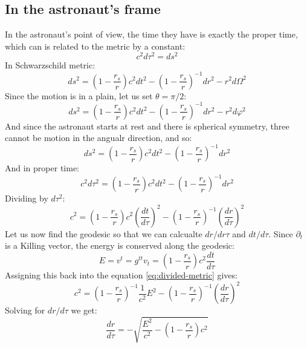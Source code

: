 \documentclass{article}
\begin{document}
\subsection{In the astronaut's frame}
In the astronaut's point of view, the time they have is exactly the proper time, which can is related to the metric by a constant:
\begin{equation}
    c^2d\tau^2 = ds^2
\end{equation}
In Schwarzschild metric:
\begin{equation}
    ds^2 = \left(1 - \frac{r_s}{r}\right)c^2dt^2 - \left(1 - \frac{r_s}{r}\right)^{-1}dr^2 - r^2d\Omega^2
\end{equation}
Since the motion is in a plain, let us set $\theta = \pi/2$:
\begin{equation}
    ds^2 = \left(1 - \frac{r_s}{r}\right)c^2dt^2 - \left(1 - \frac{r_s}{r}\right)^{-1}dr^2 - r^2d\varphi^2
\end{equation}
And since the astronaut starts at rest and there is spherical symmetry, three cannot be motion in the angualr direction, and so:
\begin{equation}
    ds^2 = \left(1 - \frac{r_s}{r}\right)c^2dt^2 - \left(1 - \frac{r_s}{r}\right)^{-1}dr^2
\end{equation}
And in proper time:
\begin{equation}
    c^2d\tau^2 = \left(1 - \frac{r_s}{r}\right)c^2dt^2 - \left(1 - \frac{r_s}{r}\right)^{-1}dr^2
\end{equation}
Dividing by $d\tau^2$:
\begin{equation}
\label{eq:divided-metric}
    c^2 = \left(1 - \frac{r_s}{r}\right)c^2\left(\frac{dt}{d\tau}\right)^2 - \left(1 - \frac{r_s}{r}\right)^{-1}\left(\frac{dr}{d\tau}\right)^2
\end{equation}
Let us now find the geodesic so that we can calcualte $dr/dr\tau$ and $dt/d\tau$. Since $\partial_t$ is a Killing vector, the energy is conserved along the geodesic:
\begin{equation}
    E = v^t = g^{tt}v_t = \left(1 - \frac{r_s}{r}\right)c^2\frac{dt}{d\tau}
\end{equation}
Assigning this back into the equation \ref{eq:divided-metric} gives:
\begin{equation}
    c^2 = \left(1 - \frac{r_s}{r}\right)^{-1}\frac{1}{c^2}E^2 - \left(1 - \frac{r_s}{r}\right)^{-1}\left(\frac{dr}{d\tau}\right)^2
\end{equation}
Solving for $dr/d\tau$ we get:
\begin{equation}
    \frac{dr}{d\tau} = -\sqrt{\frac{E^2}{c^2} - \left(1 - \frac{r_s}{r}\right)c^2}
\end{equation}
\end{document}
